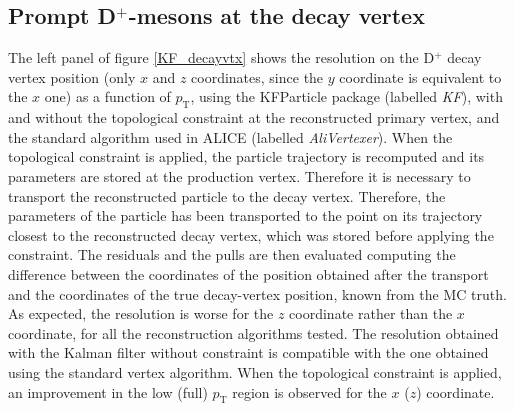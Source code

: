 \documentclass[b5paper,10pt,twoside,oldstyle,classica]{toptesi}
\newcommand{\pt}{p_\text{T}}
\begin{document}
\subsection{Prompt D$^+$-mesons at the decay vertex}
The left panel of figure \ref{KF_decayvtx} shows the resolution on the D$^+$ decay vertex position (only $x$ and $z$ coordinates, since the $y$ coordinate is equivalent to the $x$ one) as a function of $\pt$, using the KFParticle package (labelled \textit{KF}), with and without the topological constraint at the reconstructed primary vertex, and the standard algorithm used in ALICE (labelled \textit{AliVertexer}). When the topological constraint is applied, the particle trajectory is recomputed and its parameters are stored at the production vertex. Therefore it is necessary to transport the reconstructed particle to the decay vertex. Therefore, the parameters of the particle has been transported to the point on its trajectory closest to the reconstructed decay vertex, which was stored before applying the constraint. The residuals and the pulls are then evaluated computing the difference between the coordinates of the position obtained after the transport and the coordinates of the true decay-vertex position, known from the MC truth. As expected, the resolution is worse for the $z$ coordinate rather than the $x$ coordinate, for all the reconstruction algorithms tested. The resolution obtained with the Kalman filter without constraint is compatible with the one obtained using the standard vertex algorithm. When the topological constraint is applied, an improvement in the low (full) $\pt$ region is observed for the $x$ ($z$) coordinate. 
\end{document}
